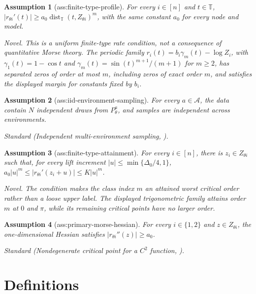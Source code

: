 \documentclass{article}
\newtheorem{assumption}{Assumption}
\begin{document}
\begin{assumption}[ass:finite-type-profile]\label{ass:finite-type-profile}
For every \(i\in[n]\) and \(t\in\mathbb T\), \(|r_{\theta i}'(t)|\ge a_0\operatorname{dist}_{\mathbb T}(t,Z_{\theta i})^m\), with the same constant \(a_0\) for every node and model.
\par\smallskip\noindent\emph{Novel.} This is a uniform finite-type rate condition, not a consequence of quantitative Morse theory. The periodic family \(r_i(t)=b_i\gamma_m(t)-\log Z_i\), with \(\gamma_1(t)=1-\cos t\) and \(\gamma_m(t)=\sin(t)^{m+1}/(m+1)\) for \(m\ge2\), has separated zeros of order at most \(m\), including zeros of exact order \(m\), and satisfies the displayed margin for constants fixed by \(b_i\).
\end{assumption}

\begin{assumption}[ass:iid-environment-sampling]\label{ass:iid-environment-sampling}
For every \(a\in\mathcal A\), the data contain \(N\) independent draws from \(P_\theta^a\), and samples are independent across environments.
\par\smallskip\noindent\emph{Standard} (Independent multi-environment sampling, \cite{AcarturkEtAl2024SampleComplexity}).
\end{assumption}

\begin{assumption}[ass:finite-type-attainment]\label{ass:finite-type-attainment}
For every \(i\in[n]\), there is \(z_i\in Z_{\theta i}\) such that, for every lift increment \(|u|\le\min\{\Delta_0/4,1\}\), \(a_0|u|^m\le |r_{\theta i}'(z_i+u)|\le K|u|^m\).
\par\smallskip\noindent\emph{Novel.} The condition makes the class index \(m\) an attained worst critical order rather than a loose upper label. The displayed trigonometric family attains order \(m\) at \(0\) and \(\pi\), while its remaining critical points have no larger order.
\end{assumption}

\begin{assumption}[ass:primary-morse-hessian]\label{ass:primary-morse-hessian}
For every \(i\in\{1,2\}\) and \(z\in Z_{\theta i}\), the one-dimensional Hessian satisfies \(|r_{\theta i}''(z)|\ge a_0\).
\par\smallskip\noindent\emph{Standard} (Nondegenerate critical point for a \(C^2\) function, \cite{Milnor1963MorseTheory}).
\end{assumption}

\section{Definitions}
\end{document}

